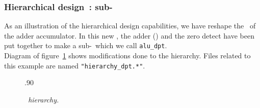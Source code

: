      \subsubsection{Hierarchical design~: sub-\datapath}
     \begin{minipage}[t]{\textwidth}
       \forceindent
         As an illustration of the hierarchical design capabilities, we
       have reshape the \netlist\ of the adder accumulator. In this new
       \netlist, the adder (\DPADDIIF) and the zero detect have been put
       together to make a sub-\datapath\ which we call {\tt alu\_dpt}.\\
       \forceindent
         Diagram of figure~\ref{schemahierarchy} shows modifications done to
       the hierarchy. Files related to this example are named
       {\tt "hierarchy\_dpt.*"}.
     \end{minipage}
     \vspace*{0.5cm}
     \begin{figure}[H]
       \begin{center}
         \leavevmode\epsfxsize.90\textwidth{}
       \end{center}
       \nopagebreak
       \caption{
         \label{schemahierarchy}
         {\it \netlist\ hierarchy.}}
     \end{figure}
